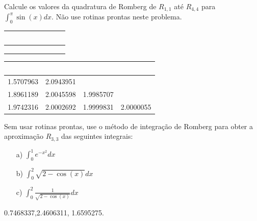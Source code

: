 \begin{Exercise}
 Calcule os valores da quadratura de Romberg de $R_{1,1}$ até $R_{4,4}$ para $\int_0^\pi \sin(x)dx$. Não use rotinas prontas neste problema.
\begin{center}
\begin{tabular}{|c|c|c|c|}
\hline
~\hspace{40pt}~ & ~\hspace{40pt}~& ~\hspace{40pt}~& ~\hspace{40pt}~\\
\hline
 & & &\\
\hline
&&&\\
\hline
&&&\\
\hline
\end{tabular}
\end{center}
\end{Exercise}
\begin{Answer}
  \begin{tiny}
\begin{center}
\begin{tabular}{|c|c|c|c|}
\hline
~\hspace{40pt}~& ~\hspace{40pt}~& ~\hspace{40pt}~&\\
\hline
1.5707963  &  2.0943951 &&\\
\hline
1.8961189  &  2.0045598 &   1.9985707  &   \\
\hline
1.9742316  &  2.0002692 &   1.9999831 &   2.0000055  \\
\hline
\end{tabular}
\end{center}    
  \end{tiny}
\end{Answer}

\begin{Exercise}
Sem usar rotinas prontas, use o método de integração de Romberg para obter a aproximação $R_{3,3}$ das seguintes integrais:
\begin{itemize}
\item[a)] $\int_{0}^1 e^{-x^2}dx$
\item[b)] $\int_{0}^2 \sqrt{2-\cos(x)}dx$
\item[c)] $\int_{0}^2 \frac{1}{\sqrt{2-\cos(x)}}dx$
\end{itemize}
\end{Exercise}
\begin{Answer}
  \begin{tiny}
0.7468337,2.4606311, 1.6595275.    
  \end{tiny}
\end{Answer}


